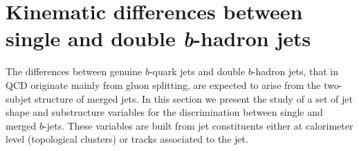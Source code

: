 \section{Kinematic differences between single and double \emph{\textbf{b}}-hadron jets}\label{sec:gbbKine}

The differences between genuine $b$-quark jets and double $b$-hadron jets, that in QCD originate mainly from gluon splitting, are expected to arise from the two-subjet structure of merged jets. In this section we present the study of a set of jet shape and substructure variables for the discrimination between single and merged $b$-jets. These variables are  built from jet constituents either at calorimeter level (topological clusters) or tracks associated to the jet.




